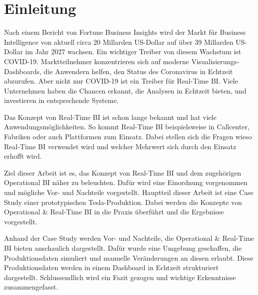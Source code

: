 \onehalfspacing
\chapter{Einleitung}
Nach einem Bericht von Fortune Business Insights wird der Markt für Business Intelligence von aktuell circa 20 Millarden US-Dollar auf über 39 Millarden US-Dollar im Jahr 2027 wachsen. Ein wichtiger Treiber von diesem Wachstum ist COVID-19. Marktteilnehmer konzentrieren sich auf moderne Visualisierungs-Dashboards, die Anwendern helfen, den Status des Coronavirus in Echtzeit abzurufen. \autocite[Vgl.][]{insights_2021} Aber nicht nur COVID-19 ist ein Treiber für Real-Time \ac{BI}. Viele Unternehmen haben die Chancen erkannt, die Analysen in Echtzeit bieten, und investieren in entsprechende Systeme. 

Das Konzept von Real-Time BI ist schon lange bekannt und hat viele Anwendungsmöglichkeiten. So kommt Real-Time BI beispielsweise in Callcenter, Fabriken oder auch Plattformen zum Einsatz. Dabei stellen sich die Fragen wieso Real-Time BI verwendet wird und welcher Mehrwert sich durch den Einsatz erhofft wird. 

Ziel dieser Arbeit ist es, das Konzept von Real-Time BI und dem zugehörigen Operational BI näher zu beleuchten. Dafür wird eine Einordnung vorgenommen und mögliche Vor- und Nachteile vorgestellt. Hauptteil dieser Arbeit ist eine Case Study einer prototypischen Tesla-Produktion. Dabei werden die Konzepte von Operational \& Real-Time BI in die Praxis überführt und die Ergebnisse vorgestellt.

Anhand der Case Study werden Vor- und Nachteile, die Operational \& Real-Time BI bieten anschaulich dargestellt. Dafür wurde eine Umgebung geschaffen, die Produktionsdaten simuliert und manuelle Veränderungen an diesen erlaubt. Diese Produktionsdaten werden in einem Dashboard in Echtzeit strukturiert dargestellt. Schlussendlich wird ein Fazit gezogen und wichtige Erkenntnisse zusammengefasst.


